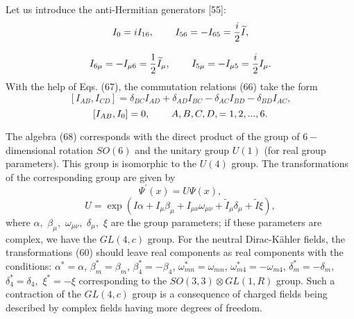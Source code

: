\documentclass[a4paper,12pt]{article}
\begin{document}
Let us introduce the anti-Hermitian generators [55]:
\[
I_0=iI_{16} ,\hspace{0.3in}I_{56}=-I_{65}=\frac i2\widetilde{I} ,
\]
\vspace{-8mm}
\begin{equation}  \label{67}
\end{equation}
\vspace{-8mm}
\[
I_{6\mu }=-I_{\mu 6}=\frac 12\widetilde{I}_\mu
,\hspace{0.3in}I_{5\mu }=-I_{\mu 5}=\frac i2I_\mu .
\]
With the help of Eqs. (67), the commutation relations (66) take the form
\[
\left[ I_{AB},I_{CD}\right] =\delta _{BC}I_{AD}+\delta
_{AD}I_{BC}-\delta _{AC}I_{BD}-\delta _{BD}I_{AC} ,
\]
\vspace{-8mm}
\begin{equation}  \label{68}
\end{equation}
\vspace{-8mm}
\[
\left[ I_{AB},I_0\right] =0 ,\hspace{0.3in}A,B,C,D,=1, 2,...,6 .
\]

The algebra (68) corresponds with the direct product of the group
of $6-$ dimensional rotation $SO(6)$ and the unitary group $U(1)$
(for real group parameters). This group is isomorphic to the
$U(4)$ group. The transformations of the corresponding group are
given by
\[
\Psi ^{\prime }(x)=U\Psi (x) ,
\]
\vspace{-8mm}
\begin{equation}  \label{69}
\end{equation}
\vspace{-8mm}
\[
U=\exp \left( I\alpha +I_\mu \beta _\mu +I_{\mu \nu }\omega _{\mu
\nu }+ \widetilde{I}_\mu \delta _\mu +\widetilde{I}\xi \right) ,
\]
where $\alpha ,$ $\beta _\mu ,$ $\omega _{\mu \nu },$ $\delta _\mu
,$ $\xi $ are the group parameters; if these parameters are
complex, we have the $ GL(4,c)$ group. For the neutral
Dirac-K\"ahler fields, the transformations (60) should leave real
components as real components with the conditions: $ \alpha
^{*}=\alpha $, $\beta _m^{*}=\beta _m$, $\beta _4^{*}=-\beta _4$,
$ \omega _{mn}^{*}=\omega _{mn}$, $\omega _{m4}^{*}=-\omega
_{m4}$, $\delta _m^{*}=-\delta _m,$ $\delta _4^{*}=\delta _4,$
$\xi ^{*}=-\xi $ corresponding to the $SO(3,3)\otimes GL(1,R)$
group. Such a contraction of the $GL(4,c)$ group is a consequence
of charged fields being described by complex fields having more
degrees of freedom.
\end{document}
